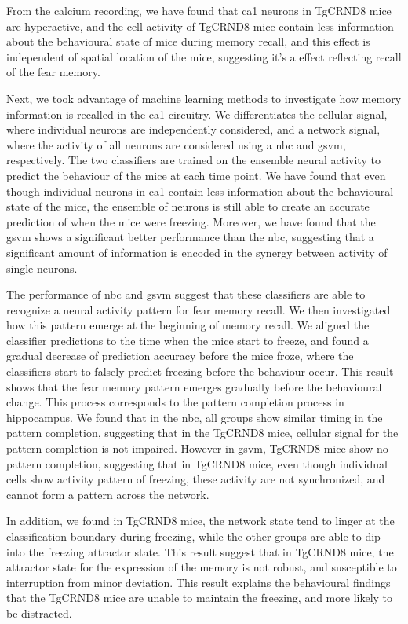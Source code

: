From the calcium recording, we have found that \gls{ca1} neurons in TgCRND8 mice are hyperactive, and the cell activity of TgCRND8 mice contain less information about the behavioural state of mice during memory recall, and this effect is independent of spatial location of the mice, suggesting it's a effect reflecting recall of the fear memory. 

Next, we took advantage of machine learning methods to investigate how memory information is recalled in the \gls{ca1} circuitry. We differentiates the cellular signal, where individual neurons are independently considered, and a network signal, where the activity of all neurons are considered using a \gls{nbc} and \gls{gsvm}, respectively. The two classifiers are trained on the ensemble neural activity to predict the behaviour of the mice at each time point. We have found that even though individual neurons in \gls{ca1} contain less information about the behavioural state of the mice, the ensemble of neurons is still able to create an accurate prediction of when the mice were freezing. Moreover, we have found that the \gls{gsvm} shows a significant better performance than the \gls{nbc}, suggesting that a significant amount of information is encoded in the synergy between activity of single neurons.

The performance of \gls{nbc} and \gls{gsvm} suggest that these classifiers are able to recognize a neural activity pattern for fear memory recall. We then investigated how this pattern emerge at the beginning of memory recall. We aligned the classifier predictions to the time when the mice start to freeze, and found a gradual decrease of prediction accuracy before the mice froze, where the classifiers start to falsely predict freezing before the behaviour occur. This result shows that the fear memory pattern emerges gradually before the behavioural change. This process corresponds to the pattern completion process in hippocampus. We found that in the \gls{nbc}, all groups show similar timing in the pattern completion, suggesting that in the TgCRND8 mice, cellular signal for the pattern completion is not impaired. However in \gls{gsvm}, TgCRND8 mice show no pattern completion, suggesting that in TgCRND8 mice, even though individual cells show activity pattern of freezing, these activity are not synchronized, and cannot form a pattern across the network. 

In addition, we found in TgCRND8 mice, the network state tend to linger at the classification boundary during freezing, while the other groups are able to dip into the freezing attractor state. This result suggest that in TgCRND8 mice, the attractor state for the expression of the memory is not robust, and susceptible to interruption from minor deviation. This result explains the behavioural findings that the TgCRND8 mice are unable to maintain the freezing, and more likely to be distracted. 

